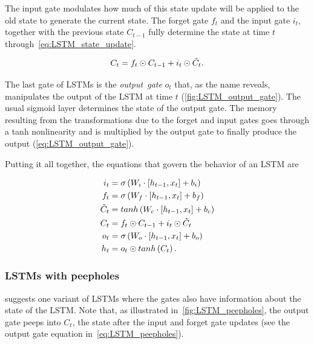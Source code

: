 The input gate modulates how much of this state update will be applied to the
old state to generate the current state. The forget gate $f_t$ and the input
gate $i_t$, together with the previous state $C_{t-1}$ fully determine the
state at time $t$ through~\autoref{eq:LSTM_state_update}.

\begin{equation}\label{eq:LSTM_state_update}
    C_t = f_t \odot C_{t-1} + i_t \odot \tilde C_t.
\end{equation}

The last gate of LSTMs is the \emph{output~gate} $o_t$ that, as the name
reveals, manipulates the output of the LSTM at time $t$
(\autoref{fig:LSTM_output_gate}). The usual sigmoid layer determines the state
of the output gate. The memory resulting from the transformations due to the
forget and input gates goes through a tanh nonlinearity and is multiplied by
the output gate to finally produce the output (\autoref{eq:LSTM_output_gate}).


Putting it all together, the equations that govern the behavior of an LSTM are

\begin{equation}\label{eq:LSTM}
\begin{split}
    i_t &= \sigma\left(W_i \cdot \left[h_{t-1}, x_t\right] + b_i \right)\\
    f_t &= \sigma\left(W_f \cdot \left[h_{t-1}, x_t\right] + b_f \right)\\
    \tilde C_t &= tanh \left(W_c \cdot \left[h_{t-1}, x_t\right] + b_c \right)\\
    C_t &= f_t \odot C_{t-1} + i_t \odot \tilde C_t\\
    o_t &= \sigma\left(W_o \cdot \left[h_{t-1}, x_t\right] + b_o \right)\\
    h_t &= o_t \odot tanh \left(C_t\right).
\end{split}
\end{equation}


\subsubsection{LSTMs with peepholes}

\cite{gers2000recurrent} suggests one variant of LSTMs where the gates also
have information about the state of the LSTM. Note that, as illustrated
in~\autoref{fig:LSTM_peepholes}, the output gate peeps into $C_t$, the state
after the input and forget gate updates (see the output gate equation
in~\autoref{eq:LSTM_peepholes}).


